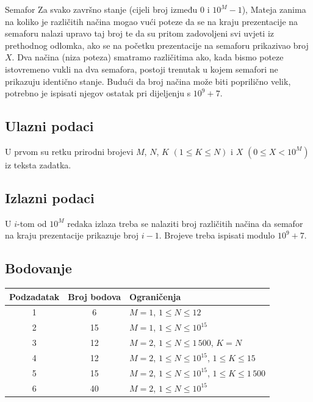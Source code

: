 \begin{statement}[
  problempoints=100,
  timelimit=4 sekunde,
  memorylimit=512 MiB,
]{Semafor}
Za svako završno stanje (cijeli broj između $0$ i $10^M-1$), Mateja zanima na
koliko je različitih načina mogao vući poteze da se na kraju prezentacije na
semaforu nalazi upravo taj broj te da su pritom zadovoljeni svi uvjeti iz
prethodnog odlomka, ako se na početku prezentacije na semaforu prikazivao
broj $X$. Dva načina (niza poteza) smatramo različitima ako, kada bismo
poteze istovremeno vukli na dva semafora, postoji trenutak u kojem semafori
ne prikazuju identično stanje. Budući da broj načina može biti poprilično
velik, potrebno je ispisati njegov ostatak pri dijeljenju s $10^9+7$.
\subsection*{Ulazni podaci}
U prvom su retku prirodni brojevi $M$, $N$, $K$ $(1 \le K \le N)$ i $X$ $(0
\le X < 10^M)$ iz teksta zadatka.

\subsection*{Izlazni podaci}
U $i$-tom od $10^M$ redaka izlaza treba se nalaziti broj različitih načina da
semafor na kraju prezentacije prikazuje broj $i-1$. Brojeve treba ispisati
modulo $10^9 + 7$.

\subsection*{Bodovanje}
{\renewcommand{\arraystretch}{1.4}
  \setlength{\tabcolsep}{6pt}
  \begin{tabular}{ccl}
 Podzadatak & Broj bodova & Ograničenja \\ \midrule
  1 & 6 & $M=1$, $1 \le N \le 12$ \\
  2 & 15 & $M=1$, $1 \le N \le 10^{15}$ \\
  3 & 12 & $M=2$, $1 \le N \le 1\,500$, $K = N$\\
  4 & 12 & $M=2$, $1 \le N \le 10^{15}$, $1 \le K \le 15$ \\
  5 & 15 & $M=2$, $1 \le N \le 10^{15}$, $1 \le K \le 1\,500$ \\
  6 & 40 & $M=2$, $1 \le N \le 10^{15}$ \\
\end{tabular}}


\end{statement}
